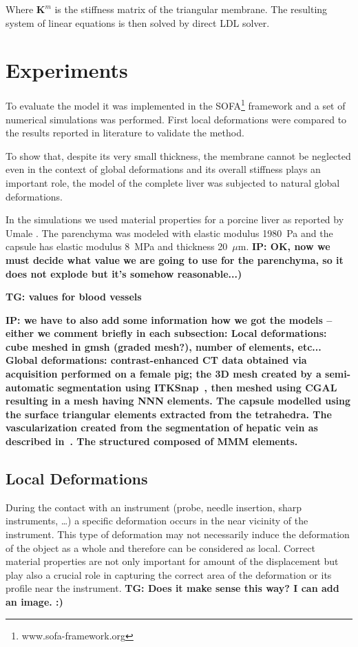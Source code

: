 \documentclass{llncs}
\newcommand{\TG}[1]{{\color{blue}\textbf{TG: #1}}}
\newcommand{\IP}[1]{{\color{cyan}\textbf{IP: #1}}}
\newcommand{\Mat}[1]{\mathbf{#1}}
\begin{document}
Where $\Mat{K}^m$ is the stiffness matrix of the triangular membrane.
The resulting
system of linear equations is then solved by direct LDL solver.




\section{Experiments} %

To evaluate the model it was implemented in the
SOFA\footnote{www.sofa-framework.org} framework and a set of
numerical simulations was performed. First local deformations were compared to the
results reported in literature to validate the method.

To show that, despite its very small thickness, the membrane cannot be
neglected even in the context of global deformations and its overall
stiffness plays an important role, the model of
the complete liver was subjected to natural global deformations.

In the simulations we used material properties for a porcine liver as
reported by Umale \cite{Umale2013}. The
parenchyma was modeled with elastic modulus 1980~Pa and the capsule has
elastic modulus 8~MPa and thickness 20~$\mu$m.
\IP{OK, now we must decide what value we are going to use for the parenchyma, so it does not explode but it's somehow reasonable...)}

\TG{values for blood vessels}

\IP{we have to also add some information how we got the models -- either we comment briefly in each subsection:
Local deformations: cube meshed in gmsh (graded mesh?), number of elements, etc...
Global deformations: contrast-enhanced CT data obtained via acquisition performed on a female pig; the 3D mesh created by a
semi-automatic segmentation using ITKSnap~\cite{itksnap}, then meshed using CGAL~\cite{cgal-meshingAlg} resulting in a mesh having 
NNN elements. The capsule modelled using the surface triangular elements extracted from the tetrahedra. The vascularization 
created from the segmentation of hepatic vein as described in~\cite{peterlik2012}. The structured composed of MMM elements.}



\subsection{Local Deformations} %

During the contact with an instrument (probe, needle insertion, sharp
instruments, \ldots) a specific deformation occurs in the near vicinity of
the instrument. This type of deformation may not necessarily induce the
deformation of the object as a whole and therefore can be considered as
local. Correct material properties are not only important for amount of the
displacement but play also a crucial role in capturing the correct area of
the deformation or its profile near the instrument.
\TG{Does it make sense this way? I can add an image. :)}
\end{document}
